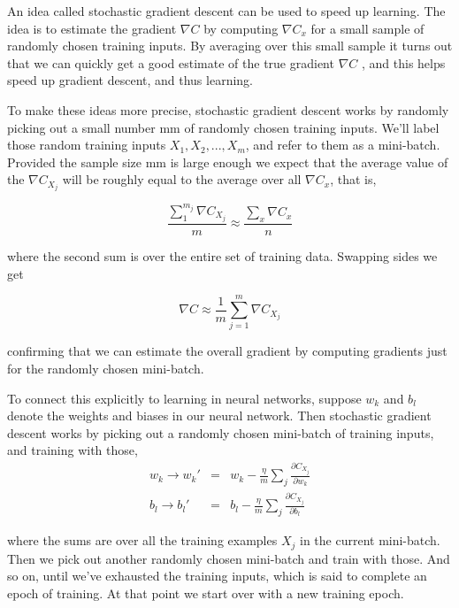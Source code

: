 \documentclass[a4paper,12pt]{report}%
\begin{document}
An idea called stochastic gradient descent can be used to speed up learning. The idea is to estimate the gradient $\nabla C$ by computing $\nabla C_{x}$ for a small sample of randomly chosen training inputs. By averaging over this small sample it turns out that we can quickly get a good estimate of the true gradient  $\nabla C$ , and this helps speed up gradient descent, and thus learning.

To make these ideas more precise, stochastic gradient descent works by randomly picking out a small number mm of randomly chosen training inputs. We'll label those random training inputs $X_{1}, X_{2},... , X_{m}$, and refer to them as a mini-batch. Provided the sample size mm is large enough we expect that the average value of the  $\nabla C_{X_{j}}$  will be roughly equal to the average over all $\nabla C_{x}$, that is,

\begin{equation}
 \frac{\sum_{1}^{m_{j}} \nabla C_{X_{j}}}{m} \approx \frac{\sum_{x} \nabla C_{x}}{n}
\end{equation}

where the second sum is over the entire set of training data. Swapping sides we get

\begin{equation}
 \nabla C \approx \frac{1}{m}\sum_{j=1}^{m} \nabla C_{X_{j}}
\end{equation}

confirming that we can estimate the overall gradient by computing gradients just for the randomly chosen mini-batch.

To connect this explicitly to learning in neural networks, suppose $w_{k}$ and $b_{l}$ denote the weights and biases in our neural network. Then stochastic gradient descent works by picking out a randomly chosen mini-batch of training inputs, and training with those,
\begin{eqnarray}
  w_{k} \rightarrow  w_{k}' &=& w_{k} - \frac{\eta}{m} \sum_{j}\frac{\partial C_{X_{j}}}{\partial w_{k}} \\
  b_{l} \rightarrow  b_{l}' &=& b_{l} - \frac{\eta}{m} \sum_{j}\frac{\partial C_{X_{j}}}{\partial b_{l}}
\end{eqnarray}

where the sums are over all the training examples $X_{j}$ in the current mini-batch. Then we pick out another randomly chosen mini-batch and train with those. And so on, until we've exhausted the training inputs, which is said to complete an epoch of training. At that point we start over with a new training epoch.
\end{document}

